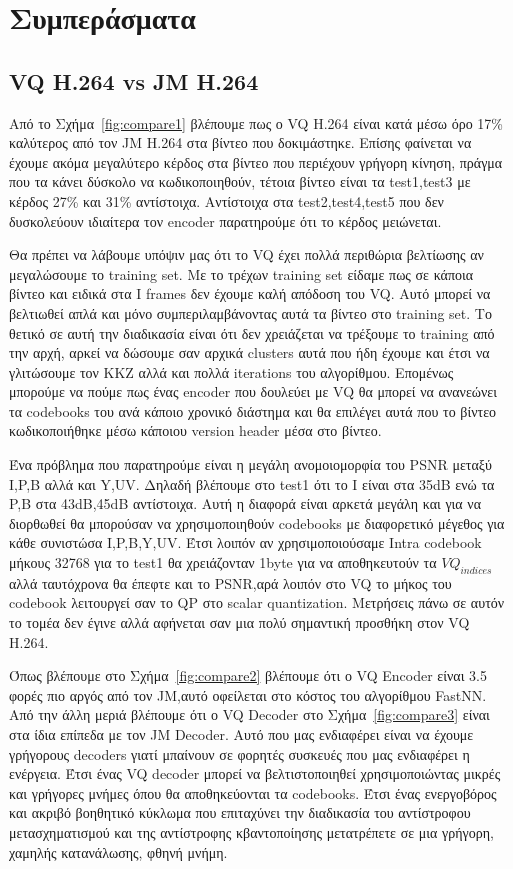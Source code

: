 ﻿\chapter{Συμπεράσματα}
\label{chapter:chap7}

\section{VQ H.264 vs JM H.264}
\label{section:sect63}

\indent Από το Σχήμα~\ref{fig:compare1} βλέπουμε πως ο VQ H.264 είναι κατά μέσω όρο 17\% καλύτερος από τον JM H.264 στα βίντεο που δοκιμάστηκε. Επίσης φαίνεται να έχουμε ακόμα μεγαλύτερο κέρδος στα βίντεο που περιέχουν γρήγορη κίνηση, πράγμα που τα κάνει δύσκολο να κωδικοποιηθούν, τέτοια βίντεο είναι τα test1,test3 με κέρδος 27\% και 31\% αντίστοιχα. Αντίστοιχα στα test2,test4,test5 που δεν δυσκολεύουν ιδιαίτερα τον encoder παρατηρούμε ότι το κέρδος μειώνεται.

\indent Θα πρέπει να λάβουμε υπόψιν μας ότι το VQ έχει πολλά περιθώρια βελτίωσης αν μεγαλώσουμε το training set. Με το τρέχων training set είδαμε πως σε κάποια βίντεο και ειδικά στα I frames δεν έχουμε καλή απόδοση του VQ. Αυτό μπορεί να βελτιωθεί απλά και μόνο συμπεριλαμβάνοντας αυτά τα βίντεο στο training set. Το θετικό σε αυτή την διαδικασία είναι ότι δεν χρειάζεται να τρέξουμε το training από την αρχή, αρκεί να δώσουμε σαν αρχικά clusters αυτά που ήδη έχουμε και έτσι να γλιτώσουμε τον KKZ αλλά και πολλά iterations του αλγορίθμου. Επομένως μπορούμε να πούμε πως ένας encoder που δουλεύει με VQ θα μπορεί να ανανεώνει τα codebooks του ανά κάποιο χρονικό διάστημα και θα επιλέγει αυτά που το βίντεο κωδικοποιήθηκε μέσω κάποιου version header μέσα στο βίντεο.

\indent Ένα πρόβλημα που παρατηρούμε είναι η μεγάλη ανομοιομορφία του PSNR μεταξύ I,P,B αλλά και Y,UV. Δηλαδή βλέπουμε στο test1 ότι το I είναι στα 35dB ενώ τα P,B στα 43dB,45dB αντίστοιχα. Αυτή η διαφορά είναι αρκετά μεγάλη και για να διορθωθεί θα μπορούσαν να χρησιμοποιηθούν codebooks με διαφορετικό μέγεθος για κάθε συνιστώσα I,P,B,Y,UV. Έτσι λοιπόν αν χρησιμοποιούσαμε Intra codebook μήκους 32768 για το test1 θα χρειάζονταν 1byte για να αποθηκευτούν τα $VQ_{indices}$ αλλά ταυτόχρονα θα έπεφτε και το PSNR,αρά λοιπόν στο VQ το μήκος του codebook λειτουργεί σαν το QP στο scalar quantization. Μετρήσεις πάνω σε αυτόν το τομέα δεν έγινε αλλά αφήνεται σαν μια πολύ σημαντική προσθήκη στον VQ H.264.

\indent Όπως βλέπουμε στο Σχήμα~\ref{fig:compare2} βλέπουμε ότι ο VQ Encoder είναι 3.5 φορές πιο αργός από τον JM,αυτό οφείλεται στο κόστος του αλγορίθμου FastNN. Από την άλλη μεριά βλέπουμε ότι ο VQ Decoder στο Σχήμα~\ref{fig:compare3} είναι στα ίδια επίπεδα με τον JM Decoder. Αυτό που μας ενδιαφέρει είναι να έχουμε γρήγορους decoders γιατί μπαίνουν σε φορητές συσκευές που μας ενδιαφέρει η ενέργεια. Έτσι ένας VQ decoder μπορεί να βελτιστοποιηθεί χρησιμοποιώντας μικρές και γρήγορες μνήμες όπου θα αποθηκεύονται τα codebooks. Έτσι ένας ενεργοβόρος και ακριβό βοηθητικό κύκλωμα που επιταχύνει την διαδικασία του αντίστροφου μετασχηματισμού και της αντίστροφης κβαντοποίησης μετατρέπετε σε μια γρήγορη, χαμηλής κατανάλωσης, φθηνή μνήμη.

